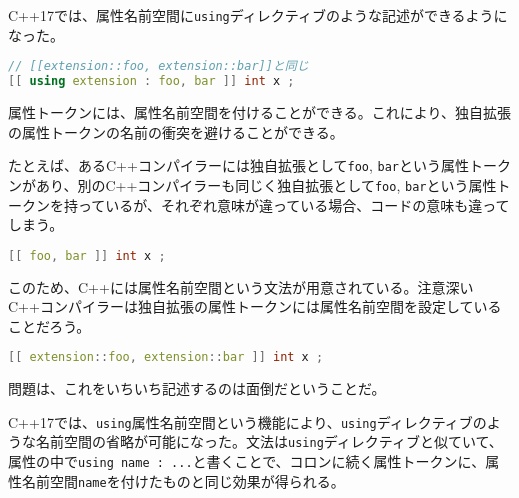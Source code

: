 %

C++17では、属性名前空間に\lstinline!using!ディレクティブのような記述ができるようになった。

\begin{lstlisting}[language=C++]
// [[extension::foo, extension::bar]]と同じ
[[ using extension : foo, bar ]] int x ;
\end{lstlisting}

属性トークンには、属性名前空間を付けることができる。これにより、独自拡張の属性トークンの名前の衝突を避けることができる。

たとえば、あるC++コンパイラーには独自拡張として\lstinline!foo!,
\lstinline!bar!という属性トークンがあり、別のC++コンパイラーも同じく独自拡張として\lstinline!foo!,
\lstinline!bar!という属性トークンを持っているが、それぞれ意味が違っている場合、コードの意味も違ってしまう。

\begin{lstlisting}[language=C++]
[[ foo, bar ]] int x ;
\end{lstlisting}

このため、C++には属性名前空間という文法が用意されている。注意深いC++コンパイラーは独自拡張の属性トークンには属性名前空間を設定していることだろう。

\begin{lstlisting}[language=C++]
[[ extension::foo, extension::bar ]] int x ;
\end{lstlisting}

問題は、これをいちいち記述するのは面倒だということだ。

C++17では、\lstinline!using!属性名前空間という機能により、\lstinline!using!ディレクティブのような名前空間の省略が可能になった。文法は\lstinline!using!ディレクティブと似ていて、属性の中で\lstinline!using name : ...!と書くことで、コロンに続く属性トークンに、属性名前空間\lstinline!name!を付けたものと同じ効果が得られる。
